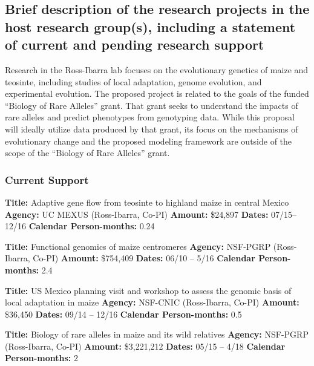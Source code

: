 \renewcommand{\thepage}{Sponsoring Scientist Statement - Page \arabic{page} of 3}

\subsection{Brief description of the research projects in the host research group(s), including a statement of current and pending research support} 
Research in the Ross-Ibarra lab focuses on the evolutionary genetics of maize and teosinte, including studies of local adaptation, genome evolution, and experimental evolution. The proposed project is related to the goals of the funded ``Biology of Rare Alleles'' grant.  That grant seeks to understand the impacts of rare alleles and predict phenotypes from genotyping data. While this proposal will ideally utilize data produced by that grant, its focus on the mechanisms of evolutionary change and the proposed modeling framework are outside of the scope of the ``Biology of Rare Alleles'' grant. 

\subsubsection*{Current Support}
\textbf{Title:} Adaptive gene flow from teosinte to highland maize in central Mexico
\textbf{Agency:} UC MEXUS (Ross-Ibarra, Co-PI)
\textbf{Amount:} \$24,897
\textbf{Dates:} 07/15– 12/16
\textbf{Calendar Person-months:} 0.24

\noindent\textbf{Title:} Functional genomics of maize centromeres 
\textbf{Agency:} NSF-PGRP (Ross-Ibarra, Co-PI)
\textbf{Amount:} \$754,409
\textbf{Dates:} 06/10 – 5/16
\textbf{Calendar Person-months:} 2.4

\noindent\textbf{Title:} US Mexico planning visit and workshop to assess the genomic basis of local adaptation in maize 
\textbf{Agency:} NSF-CNIC (Ross-Ibarra, Co-PI)
\textbf{Amount:} \$36,450
\textbf{Dates:} 09/14 – 12/16
\textbf{Calendar Person-months:} 0.5

\textbf{Title:} Biology of rare alleles in maize and its wild relatives 
\textbf{Agency:} NSF-PGRP (Ross-Ibarra, Co-PI)
\textbf{Amount:} \$3,221,212
\textbf{Dates:} 05/15 – 4/18
\textbf{Calendar Person-months:} 2


